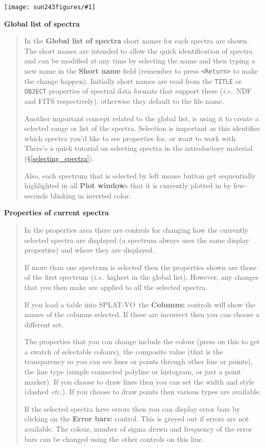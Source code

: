\documentclass[twoside,11pt]{article}
\newcommand{\htmladdimg}[1]{}
\newcommand{\htmlref}[2]{#1}
\newcommand{\latex}[1]{#1}
\newcommand{\latexhtml}[2]{#1}
\renewcommand{\_}{\texttt{\symbol{95}}}
\newcommand{\SPLAT}{\textsf{SPLAT-VO}}
\newcommand{\mainfigure}[1]
{\begin{center}
 \latexhtml{\texttt{[image: sun243\_figures/\#1]}}{\htmladdimg{#1.gif}}
 \end{center}
}
\newcommand{\labelitem}[1]{\textbf{#1}}
\newcommand{\hitext}[1]{\texttt{#1}}
\newcommand{\ie}{\textit{i.e.}}
\newcommand{\etc}{\textit{etc.}}
\newcommand{\subheading}[1]{\textbf{\large{#1}}}
\begin{document}
\mainfigure{browser5}

\subheading{Global list of spectra}
\begin{quote}
 In the \labelitem{Global list of spectra} short names for each
 spectra are shown. The short names are intended to allow the quick
 identification of spectra and can be modified at any time by
 selecting the name and then typing a new name in the
 \labelitem{Short name} field (remember to press \hitext{<Return>} to
 make the change happen). Initially short names are read from the
 \hitext{TITLE} or \hitext{OBJECT} properties of spectral data formats
 that support these (\ie\ NDF and FITS respectively), otherwise they
 default to the file name.

 Another important concept related to the global list, is using it to
 create a selected range or list of the spectra. Selection is
 important as this identifies which spectra you'd like to see
 properties for, or want to work with. There's a quick tutorial on
 \htmlref{selecting spectra}{selecting_spectra} in the introductory material
 \latex{(\S\ref{selecting_spectra})}.
 
 Also, each spectrum that is selected by left mouse button get sequentially
 highlighted in all \labelitem{Plot window}s that it is currently plotted in
 by few-seconds blinking in inverted color.
 
\end{quote}

\subheading{Properties of current spectra}
\begin{quote}
 In the properties area there are controls for changing how the currently
 selected spectra are displayed (a spectrum always uses the same display
 properties) and where they are displayed.

 If more than one spectrum is selected then the properties shown are those of
 the first spectrum (\ie\ highest in the global list). However, any changes
 that you then make are applied to all the selected spectra.

 If you load a table into \SPLAT\ the \labelitem{Columns:} controls will show
 the names of the columns selected. If these are incorrect then you can choose
 a different set.

 The properties that you can change include the colour (press on this to get a
 swatch of selectable colours), the composite value (that is the transparency
 so you can see lines or points through other line or points), the line type
 (simple connected polyline or histogram, or just a point marker). If you
 choose to draw lines then you can set the width and style (dashed \etc). If
 you choose to draw points then various types are available.

 If the selected spectra have errors then you can display error bars by
 clicking on the \labelitem{Error bars:} control. This is greyed out if errors
 are not available. The colour, number of sigma drawn and frequency of the
 error bars can be changed using the other controls on this line.

\end{quote}
\end{document}
